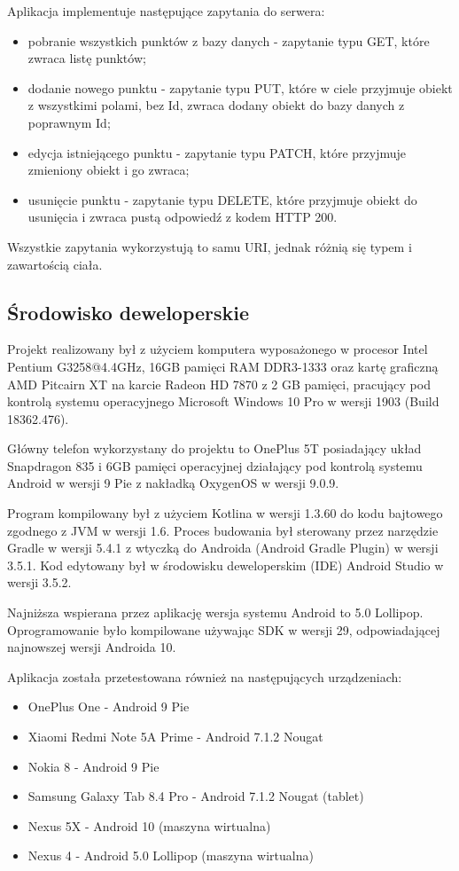 \documentclass[polish,polish,a4paper,12pt]{article}
\begin{document}
	Aplikacja implementuje następujące zapytania do serwera:

	\begin{itemize}
		\item pobranie wszystkich punktów z bazy danych - zapytanie typu GET, które zwraca listę punktów;
		\item dodanie nowego punktu - zapytanie typu PUT, które w ciele przyjmuje obiekt z wszystkimi polami, bez Id, zwraca dodany obiekt do bazy danych z poprawnym Id;
		\item edycja istniejącego punktu - zapytanie typu PATCH, które przyjmuje zmieniony obiekt i go zwraca;
		\item usunięcie punktu - zapytanie typu DELETE, które przyjmuje obiekt do usunięcia i zwraca pustą odpowiedź z kodem HTTP 200.
	\end{itemize}

	Wszystkie zapytania wykorzystują to samu URI, jednak różnią się typem i zawartością ciała.

	\subsection{Środowisko deweloperskie}

	Projekt realizowany był z użyciem komputera wyposażonego w procesor Intel Pentium G3258@4.4GHz, 16GB pamięci RAM DDR3-1333 oraz kartę graficzną AMD Pitcairn XT na karcie Radeon HD 7870 z 2 GB pamięci, pracujący pod kontrolą systemu operacyjnego Microsoft Windows 10 Pro w wersji 1903 (Build 18362.476).

	Główny telefon wykorzystany do projektu to OnePlus 5T posiadający układ Snapdragon 835 i 6GB pamięci operacyjnej działający pod kontrolą systemu Android w wersji 9 Pie z nakładką OxygenOS w wersji 9.0.9.

	Program kompilowany był z użyciem Kotlina w wersji 1.3.60 do kodu bajtowego zgodnego z JVM w wersji 1.6. Proces budowania był sterowany przez narzędzie Gradle w wersji 5.4.1 z wtyczką do Androida (Android Gradle Plugin) w wersji 3.5.1. Kod edytowany był w środowisku deweloperskim (IDE) Android Studio w wersji 3.5.2.

	Najniższa wspierana przez aplikację wersja systemu Android to 5.0 Lollipop. Oprogramowanie było kompilowane używając SDK w wersji 29, odpowiadającej najnowszej wersji Androida 10.

	Aplikacja została przetestowana również na następujących urządzeniach:

	\begin{itemize}
		\item OnePlus One - Android 9 Pie
		\item Xiaomi Redmi Note 5A Prime - Android 7.1.2 Nougat
		\item Nokia 8 - Android 9 Pie
		\item Samsung Galaxy Tab 8.4 Pro - Android 7.1.2 Nougat (tablet)
		\item Nexus 5X - Android 10 (maszyna wirtualna)
		\item Nexus 4 - Android 5.0 Lollipop (maszyna wirtualna)
	\end{itemize}
\end{document}

